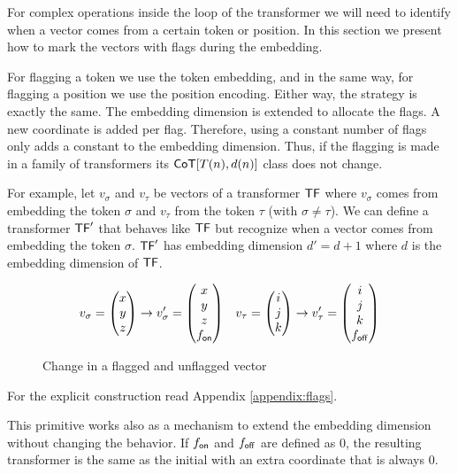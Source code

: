 For complex operations inside the loop of the transformer we will need to identify when a vector comes from a certain token or position.
In this section we present how to mark the vectors with flags during the embedding.

\bigskip


For flagging a token we use the token embedding, and in the same way, for flagging a position we use the position encoding.
Either way, the strategy is exactly the same.
The embedding dimension is extended to allocate the flags.
A new coordinate is added per flag.
Therefore, using a constant number of flags only adds a constant to the embedding dimension.
Thus, if the flagging is made in a family of transformers its $\mathsf{CoT}[T(n), d(n)]$ class does not change.

For example, let $v_\sigma$ and $v_\tau$ be vectors of a transformer $\mathsf{TF}$ where $v_\sigma$ comes from embedding the token $\sigma$ and $v_\tau$ from the token $\tau$ (with $\sigma \neq \tau$).
We can define a transformer $\mathsf{TF}'$ that behaves like $\mathsf{TF}$ but recognize when a vector comes from embedding the token $\sigma$.
$\mathsf{TF}'$ has embedding dimension $d' = d + 1$ where $d$ is the embedding dimension of $\mathsf{TF}$.

\begin{figure}[h]
    \begin{align*}
        & v_\sigma = \left(\begin{matrix} x \\ y \\ z \\ \end{matrix}\right) \to v'_\sigma = \left(\begin{matrix} x \\ y \\ z \\ f_{\mathsf{on}} \end{matrix}\right)
        & v_\tau   = \left(\begin{matrix} i \\ j \\ k \\ \end{matrix}\right) \to v'_\tau   = \left(\begin{matrix} i \\ j \\ k \\ f_{\mathsf{off}} \end{matrix}\right)
    \end{align*}
    \caption{Change in a flagged and unflagged vector}
\end{figure}

For the explicit construction read Appendix \ref{appendix:flags}.

\bigskip

This primitive works also as a mechanism to extend the embedding dimension without changing the behavior.
If $f_{\mathsf{on}}$ and $f_{\mathsf{off}}$ are defined as $0$, the resulting transformer is the same as the initial with an extra coordinate that is always $0$.